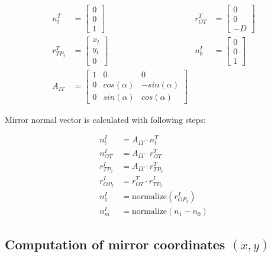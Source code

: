 \begin{align*}
    n^{T}_{t}       & =
    \begin{bmatrix}
        0 \\
        0 \\
        1
    \end{bmatrix} &
    r^{T}_{OT}      & =
    \begin{bmatrix}
        0 \\
        0 \\
        -D
    \end{bmatrix}      \\
    r^{T}_{TP_{2}}  & =
    \begin{bmatrix}
        x_{t} \\
        y_{t} \\
        0
    \end{bmatrix} &
    n^{I}_{0}       & =
    \begin{bmatrix}
        0 \\
        0 \\
        1
    \end{bmatrix}      \\
    A_{IT}          & =
    \begin{bmatrix}
        1 & 0           & 0            \\
        0 & cos(\alpha) & -sin(\alpha) \\
        0 & sin(\alpha) & cos(\alpha)
    \end{bmatrix}
\end{align*}


Mirror normal vector is calculated with following steps:

\begin{align*}
    n^{I}_{t}      & = A_{IT} \cdot n^{T}_{t}          \\
    n^{I}_{OT}     & = A_{IT} \cdot r^{T}_{OT}         \\
    r^{I}_{TP_{2}} & = A_{IT} \cdot r^{T}_{TP_{2}}     \\
    r^{I}_{OP_{2}} & = r^{T}_{OT} \cdot r^{I}_{TP_{2}} \\
    n^{I}_{1}      & = \text{normalize}(r^{I}_{OP_{2}})       \\
    n^{I}_{m}      & = \text{normalize}(n_{1} - n_{0})
\end{align*}

\subsection{Computation of mirror coordinates $(x, y)$ }
\label{subsec:compute_mirror_coordinates}


